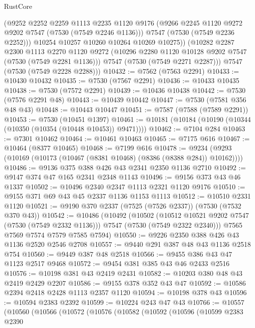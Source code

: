 \begin{lexlean}{RustCore}
\begin{coremodule}
          (@9252
            @2252
            @2259
            @1113
            @2235
            @1120
            @9176
            (@9266 @2245 @1120 @9272 @9202 @7547 (@7530 (@7549 @2246 @1136)))
            @7547
            (@7530 (@7549 @2236 @2252)))
          @10254
          @10257
          @10260
          @10264
          @10269
          @10275))
      (@10282
        @2287
        @2300
        @1113
        @2270
        @1120
        @9272
        (@10296 @2280 @1120 @10128 @9202 @7547 (@7530 (@7549 @2281 @1136)))
        @7547
        (@7530 (@7549 @2271 @2287)))
      @7547
      (@7530 (@7549 @2228 @2288)))
@10432 := @7562 (@7563 @2291)
@10433 := @10430 @10432
@10435 := @7530 (@7567 @2291)
@10436 := @10433 @10435
@10438 := @7530 (@7572 @2291)
@10439 := @10436 @10438
@10442 := @7530 (@7576 @2291 @48)
@10443 := @10439 @10442
@10447 := @7530 (@7581 @356 @48 @43)
@10448 := @10443 @10447
@10451 := @7587 (@7588 (@7589 @2291))
@10453 := @7530 (@10451 @1397)
@10461 := @10181 (@10184 (@10190 (@10344 (@10350 (@10354 (@10448 @10453)) @9471))))
@10462 := @7104 @284
@10463 := @7301 @10462
@10464 := @10461 @10463
@10465 := @7175 @616
@10467 := @10464 (@8377 @10465)
@10468 := @7199 @616
@10478 := @9234 (@9293 (@10169 (@10173 (@10467 (@8381 @10468) (@8386 (@8388 @284)) @10162))))
@10486 := @9136 @375 @388 @426 @43 @2341 @2350 @1136 @2710
@10492 := @9147 @374 @47 @165 @2341 @2348 @1143
@10496 := @9156 @373 @43 @46 @1337
@10502 := @10496 @2340 @2347 @1113 @2321 @1120 @9176
@10510 := @9155 @371 @69 @43 @45 @2337 @1136 @1153 @1113
@10512 := @10510 @2331 @1120
@10521 := @9190 @370 @2337 (@7525 (@7526 @2337)) (@7530 (@7532 @370 @43))
@10542 := @10486
    (@10492
      (@10502
        (@10512 @10521 @9202 @7547 (@7530 (@7549 @2332 @1136)))
        @7547
        (@7530 (@7549 @2322 @2340)))
      @7565
      @7569
      @7574
      @7579
      @7585
      @7594)
@10550 := @9226 @2350 @388 @426 @43 @1136 @2520 @2546 @2708
@10557 := @9440 @291 @387 @48 @43 @1136 @2518 @754
@10560 := @9449 @387 @48 @2518
@10566 := @9455 @386 @43 @47 @1123 @2517 @9468
@10572 := @9454 @381 @385 @43 @46 @2433 @2516
@10576 := @10198 @381 @43 @2419 @2431
@10582 := @10203 @380 @48 @43 @2419 @2429 @2207
@10586 := @9155 @378 @352 @43 @47
@10592 := @10586 @2394 @2418 @2428 @1113 @2357 @1120
@10594 := @10198 @378 @43
@10596 := @10594 @2383 @2392
@10599 := @10224 @243 @47 @43
@10766 := @10557
    (@10560
      (@10566
        (@10572
          (@10576
            (@10582
              (@10592
                (@10596
                  (@10599
                    @2383
                    @2390

\end{coremodule}
\end{lexlean}
